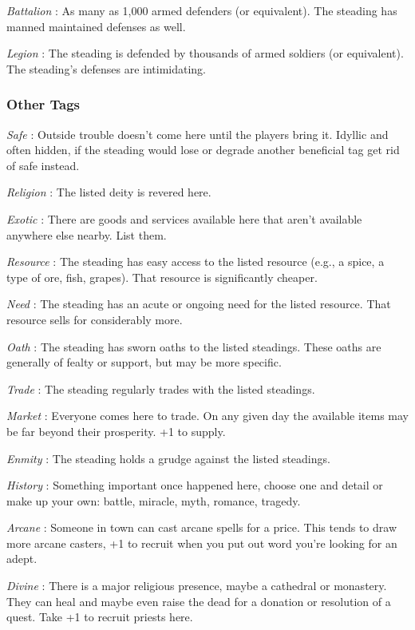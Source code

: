 \emph{Battalion}
: As many as 1,000 armed defenders (or equivalent). The steading has manned maintained defenses as well.


\emph{Legion}
: The steading is defended by thousands of armed soldiers (or equivalent). The steading's defenses are intimidating.
\subsubsection{Other Tags}


\emph{Safe}
: Outside trouble doesn't come here until the players bring it. Idyllic and often hidden, if the steading would lose or degrade another beneficial tag get rid of safe instead.


\emph{Religion}
: The listed deity is revered here.


\emph{Exotic}
: There are goods and services available here that aren't available anywhere else nearby. List them.


\emph{Resource}
: The steading has easy access to the listed resource (e.g., a spice, a type of ore, fish, grapes). That resource is significantly cheaper.


\emph{Need}
: The steading has an acute or ongoing need for the listed resource. That resource sells for considerably more.


\emph{Oath}
: The steading has sworn oaths to the listed steadings. These oaths are generally of fealty or support, but may be more specific.


\emph{Trade}
: The steading regularly trades with the listed steadings.


\emph{Market}
: Everyone comes here to trade. On any given day the available items may be far beyond their prosperity. +1 to supply.


\emph{Enmity}
: The steading holds a grudge against the listed steadings.


\emph{History}
: Something important once happened here, choose one and detail or make up your own: battle, miracle, myth, romance, tragedy.


\emph{Arcane}
: Someone in town can cast arcane spells for a price. This tends to draw more arcane casters, +1 to recruit when you put out word you're looking for an adept.


\emph{Divine}
: There is a major religious presence, maybe a cathedral or monastery. They can heal and maybe even raise the dead for a donation or resolution of a quest. Take +1 to recruit priests here.


